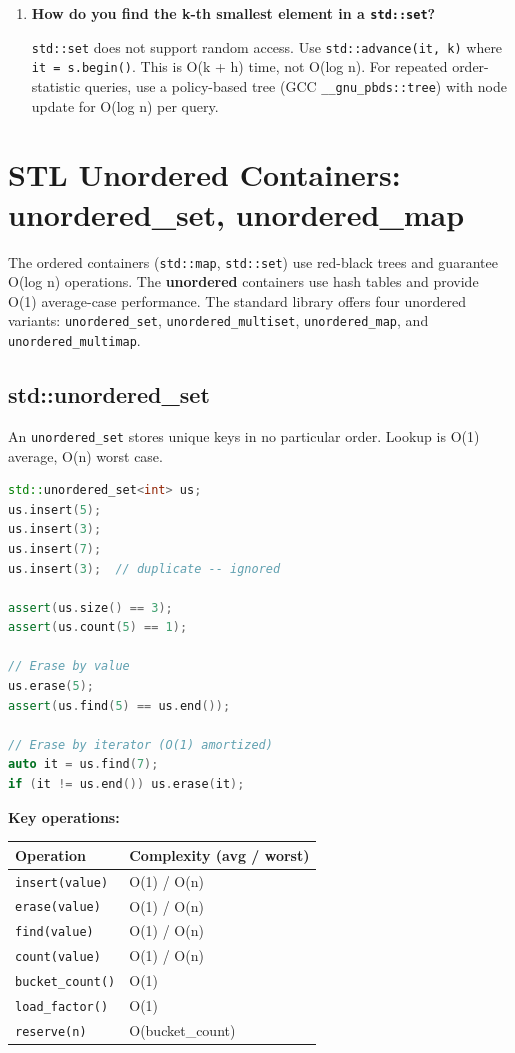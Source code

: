 \begin{enumerate}
\item \textbf{How do you find the k-th smallest element in a \texttt{std::set}?}

\texttt{std::set} does not support random access. Use \texttt{std::advance(it, k)} where \texttt{it = s.begin()}. This is O(k + h) time, not O(log n). For repeated order-statistic queries, use a policy-based tree (GCC \texttt{\_\_gnu\_pbds::tree}) with node update for O(log n) per query.
\end{enumerate}

\section{STL Unordered Containers: unordered\_set, unordered\_map}

\label{sec:unordered-containers}

The ordered containers (\texttt{std::map}, \texttt{std::set}) use red-black trees and guarantee O(log n) operations. The \textbf{unordered} containers use hash tables and provide O(1) average-case performance. The standard library offers four unordered variants: \texttt{unordered\_set}, \texttt{unordered\_multiset}, \texttt{unordered\_map}, and \texttt{unordered\_multimap}.

\subsection{std::unordered\_set}

An \texttt{unordered\_set} stores unique keys in no particular order. Lookup is O(1) average, O(n) worst case.

\begin{lstlisting}[language=C++]
std::unordered_set<int> us;
us.insert(5);
us.insert(3);
us.insert(7);
us.insert(3);  // duplicate -- ignored

assert(us.size() == 3);
assert(us.count(5) == 1);

// Erase by value
us.erase(5);
assert(us.find(5) == us.end());

// Erase by iterator (O(1) amortized)
auto it = us.find(7);
if (it != us.end()) us.erase(it);
\end{lstlisting}

\textbf{Key operations:}

\begin{center}
\begin{tabular}{ll}
\toprule
Operation & Complexity (avg / worst) \\
\midrule
\texttt{insert(value)} & O(1) / O(n) \\
\texttt{erase(value)} & O(1) / O(n) \\
\texttt{find(value)} & O(1) / O(n) \\
\texttt{count(value)} & O(1) / O(n) \\
\texttt{bucket\_count()} & O(1) \\
\texttt{load\_factor()} & O(1) \\
\texttt{reserve(n)} & O(bucket\_count) \\
\bottomrule
\end{tabular}
\end{center}

